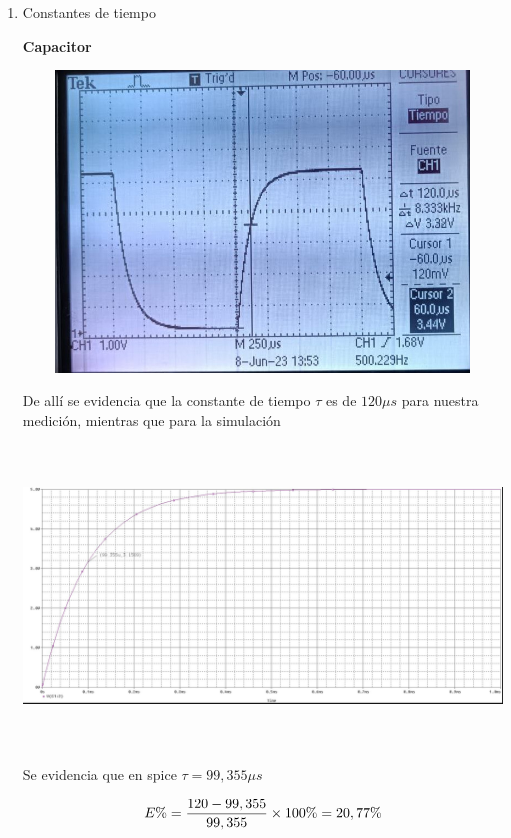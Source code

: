 \documentclass[12pt]{article}
\begin{document}
\begin{enumerate}
		\item Constantes de tiempo
		
		\noindent \textbf{Capacitor}
		
		\begin{center}
			\includegraphics[width=16cm,height=8cm]{Img/capacitor}
		\end{center}
		
		\noindent De allí se evidencia que la constante de tiempo $\tau$ es de $120\mu s$ para nuestra medición, mientras que para la simulación
		
		\begin{center}
			\includegraphics[width=16cm,height=8cm]{Img/capacitor_spice}
		\end{center}
		
		\noindent Se evidencia que en spice $\tau = 99,355 \mu s$
		
		\begin{equation}
			\notag E\% = \frac{120 - 99,355}{99,355}\times 100\% = 20,77\%
		\end{equation}
		

\end{enumerate}
\end{document}

